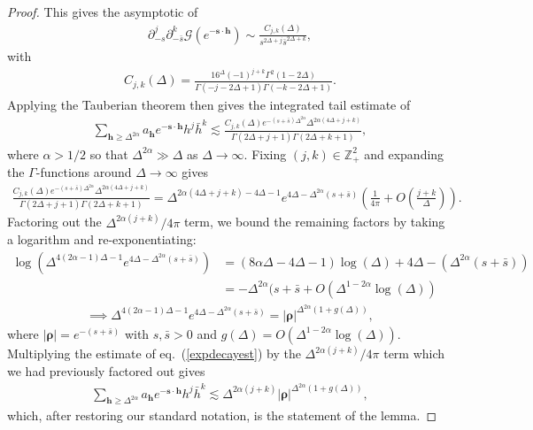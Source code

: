 \documentclass[a4paper,11pt]{article}
\theoremstyle{plain}
\theoremstyle{definition}
\theoremstyle{remark}
\newcommand{\bs}[1]{\boldsymbol{#1}}
\newcommand{\bh}{{\bar{h}}}
\newcommand{\ba}{\begin{equation} \begin{aligned}}
\newcommand{\ea}{\end{aligned} \end{equation}}
\newcommand{\De}{\Delta}
\begin{document}
\begin{appendix}
\begin{proof}
This gives the asymptotic of 
\ba
\partial_{-s}^j \partial_{-\bar{s}}^k \mathcal{G}(e^{-\bs{s}\cdot \bs{h}}) \sim \frac{C_{j,k}(\De)}{ s^{2\De + j} \bar{s}^{2\De + k}}  , 
\ea
with
\ba
C_{j,k}(\De) = \frac{ 16^{\De} (-1)^{j+k} \Gamma^2 (1-2 \Delta )}{\Gamma (-j-2 \Delta +1)\Gamma (-k-2 \Delta +1)}.
\ea
Applying the Tauberian theorem then gives the integrated tail estimate of
\ba
\sum_{\bs{h} \geq \De^{2\alpha} } a_{\bs{h}} e^{-\bs{s}\cdot \bs{h}} h^j \bh^k \lesssim \frac{C_{j,k}(\De) e^{-(s+\bar{s})\De^{2\alpha}} \De^{2\alpha( 4\De + j+k)} }{ \Gamma(2\De+j +1) \Gamma(2\De + k+ 1)},
\ea
where $\alpha > 1/2$ so that $\De^{2\alpha} \gg \De$ as $\De \to\infty$. Fixing $(j,k) \in \mathbb{Z}_+^2$ and expanding the $\Gamma$-functions around $\De \to \infty$ gives
\ba
\frac{C_{j,k}(\De) e^{-(s+\bar{s})\De^{2\alpha}} \De^{2\alpha( 4\De + j+k)} }{ \Gamma(2\De+j +1) \Gamma(2\De + k+ 1)} = \Delta ^{2 \alpha  (4 \Delta +j+k)-4 \Delta -1} e^{4 \Delta -\Delta ^{2 \alpha } (s+\bar{s})}\left(\frac{1}{4\pi} + O\left(\frac{j+k}{\De} \right) \right).
\ea
Factoring out the $\De^{2\alpha( j +k)}/4\pi$ term, we bound the remaining factors by taking a logarithm and re-exponentiating:
\ba
\log( \Delta ^{4 (2 \alpha -1) \Delta -1 } e^{4 \Delta -\Delta ^{2 \alpha } (s+\bar{s})} ) &=(8 \alpha  \Delta -4 \Delta -1) \log (\Delta )+4 \Delta -\left(\Delta ^{2 \alpha } (s+\bar{s})\right)\\
& = -\De^{2\alpha}(s+\bar{s} + O(\De^{1-2\alpha}\log(\De))
\ea
\ba
\implies \Delta ^{4 (2 \alpha -1) \Delta -1  } e^{4 \Delta -\Delta ^{2 \alpha } (s+\bar{s})}  = |\bs{\rho}|^{\De^{2\alpha}(1 + g(\De))},
\label{expdecayest}
\ea
where $|\bs{\rho}| = e^{-(s+\bar{s})}$ with $s,\bar{s}>0$ and $g(\De) = O(\De^{1-2\alpha} \log(\De))$. Multiplying the estimate of eq.~(\ref{expdecayest}) by the $\De^{2\alpha(j+k)} /4\pi$ term which we had previously factored out gives
\ba
\sum_{\bs{h} \geq \De^{2\alpha} } a_{\bs{h}} e^{-\bs{s}\cdot \bs{h}} h^j \bh^k \lesssim \De^{2\alpha(j+k)} |\bs{\rho}|^{\De^{2\alpha}(1+g(\De))},
\ea
which, after restoring our standard notation, is the statement of the lemma.
\end{proof}


\end{appendix}
\end{document}
